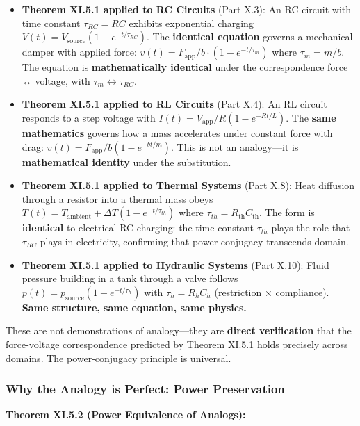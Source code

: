 \documentclass[
]{article}
\begin{document}
\begin{itemize}
\item
  \textbf{Theorem XI.5.1 applied to RC Circuits} (Part X.3): An RC
  circuit with time constant \(\tau_{RC} = RC\) exhibits exponential
  charging \(V(t) = V_{\text{source}}(1 - e^{-t/\tau_{RC}})\). The
  \textbf{identical equation} governs a mechanical damper with applied
  force: \(v(t) = F_{\text{app}}/b \cdot (1 - e^{-t/\tau_m})\) where
  \(\tau_m = m/b\). The equation is \textbf{mathematically identical}
  under the correspondence force ↔ voltage, with
  \(\tau_m \leftrightarrow \tau_{RC}\).
\item
  \textbf{Theorem XI.5.1 applied to RL Circuits} (Part X.4): An RL
  circuit responds to a step voltage with
  \(I(t) = V_{\text{app}}/R (1 - e^{-Rt/L})\). The \textbf{same
  mathematics} governs how a mass accelerates under constant force with
  drag: \(v(t) = F_{\text{app}}/b (1 - e^{-bt/m})\). This is not an
  analogy---it is \textbf{mathematical identity} under the substitution.
\item
  \textbf{Theorem XI.5.1 applied to Thermal Systems} (Part X.8): Heat
  diffusion through a resistor into a thermal mass obeys
  \(T(t) = T_{\text{ambient}} + \Delta T(1 - e^{-t/\tau_{th}})\) where
  \(\tau_{th} = R_{\text{th}} C_{\text{th}}\). The form is
  \textbf{identical} to electrical RC charging: the time constant
  \(\tau_{th}\) plays the role that \(\tau_{RC}\) plays in electricity,
  confirming that power conjugacy transcends domain.
\item
  \textbf{Theorem XI.5.1 applied to Hydraulic Systems} (Part X.10):
  Fluid pressure building in a tank through a valve follows
  \(p(t) = p_{\text{source}}(1 - e^{-t/\tau_h})\) with
  \(\tau_h = R_h C_h\) (restriction × compliance). \textbf{Same
  structure, same equation, same physics.}
\end{itemize}

These are not demonstrations of analogy---they are \textbf{direct
verification} that the force-voltage correspondence predicted by Theorem
XI.5.1 holds precisely across domains. The power-conjugacy principle is
universal.

\subsubsection{Why the Analogy is Perfect: Power
Preservation}\label{why-the-analogy-is-perfect-power-preservation}

\textbf{Theorem XI.5.2 (Power Equivalence of Analogs):}
\end{document}
